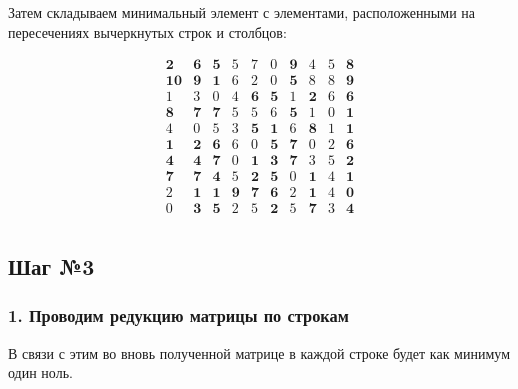 \documentclass[17pt]{extarticle}
\begin{document}
Затем складываем минимальный элемент с элементами, расположенными на пересечениях вычеркнутых строк и столбцов:

\[
    \begin{array}{*{10}{c}}
        \textbf{2}  & \textbf{6} & \textbf{5} & 5          & 7          & 0          & \textbf{9} & 4          & 5 & \textbf{8} \\
        \textbf{10} & \textbf{9} & \textbf{1} & 6          & 2          & 0          & \textbf{5} & 8          & 8 & \textbf{9} \\
        1           & 3          & 0          & 4          & \textbf{6} & \textbf{5} & 1          & \textbf{2} & 6 & \textbf{6} \\
        \textbf{8}  & \textbf{7} & \textbf{7} & 5          & 5          & 6          & \textbf{5} & 1          & 0 & \textbf{1} \\
        4           & 0          & 5          & 3          & \textbf{5} & \textbf{1} & 6          & \textbf{8} & 1 & \textbf{1} \\
        \textbf{1}  & \textbf{2} & \textbf{6} & 6          & 0          & \textbf{5} & \textbf{7} & 0          & 2 & \textbf{6} \\
        \textbf{4}  & \textbf{4} & \textbf{7} & 0          & \textbf{1} & \textbf{3} & \textbf{7} & 3          & 5 & \textbf{2} \\
        \textbf{7}  & \textbf{7} & \textbf{4} & 5          & \textbf{2} & \textbf{5} & 0          & \textbf{1} & 4 & \textbf{1} \\
        2           & \textbf{1} & \textbf{1} & \textbf{9} & \textbf{7} & \textbf{6} & 2          & \textbf{1} & 4 & \textbf{0} \\
        0           & \textbf{3} & \textbf{5} & 2          & 5          & \textbf{2} & 5          & \textbf{7} & 3 & \textbf{4} \\
    \end{array}
\]

\subsection*{Шаг №3}

\subsubsection*{1. Проводим редукцию матрицы по строкам}

В связи с этим во вновь полученной матрице в каждой строке будет как минимум один ноль.
\end{document}
